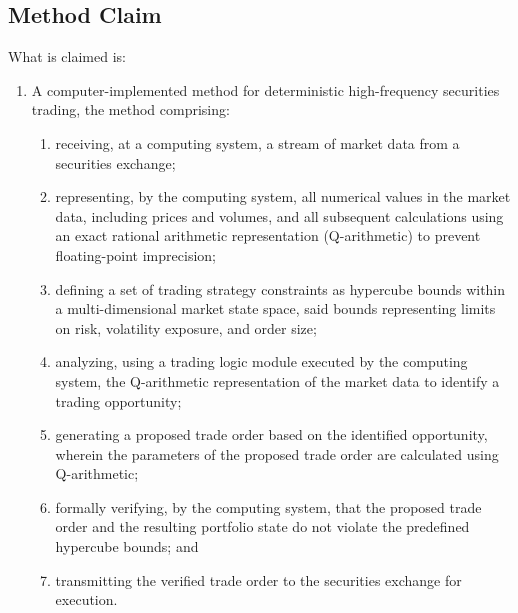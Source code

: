 \documentclass{article}
\begin{document}
\subsection{Method Claim}
\noindent What is claimed is:
\begin{enumerate}
    \item A computer-implemented method for deterministic high-frequency securities trading, the method comprising:
    \begin{enumerate}
        \item[(a)] receiving, at a computing system, a stream of market data from a securities exchange;
        \item[(b)] representing, by the computing system, all numerical values in the market data, including prices and volumes, and all subsequent calculations using an exact rational arithmetic representation (Q-arithmetic) to prevent floating-point imprecision;
        \item[(c)] defining a set of trading strategy constraints as hypercube bounds within a multi-dimensional market state space, said bounds representing limits on risk, volatility exposure, and order size;
        \item[(d)] analyzing, using a trading logic module executed by the computing system, the Q-arithmetic representation of the market data to identify a trading opportunity;
        \item[(e)] generating a proposed trade order based on the identified opportunity, wherein the parameters of the proposed trade order are calculated using Q-arithmetic;
        \item[(f)] formally verifying, by the computing system, that the proposed trade order and the resulting portfolio state do not violate the predefined hypercube bounds; and
        \item[(g)] transmitting the verified trade order to the securities exchange for execution.
    \end{enumerate}
\end{enumerate}
\end{document}
